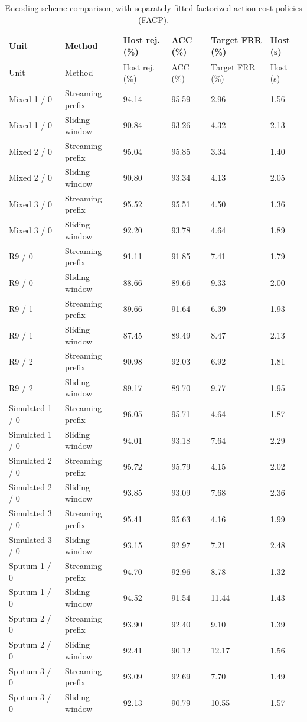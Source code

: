 \begin{longtable}{llllll}
\caption{Encoding scheme comparison, with separately fitted factorized action-cost policies (FACP).}\label{tab:s_encoder}\\
\toprule
Unit & Method & Host rej. (\%) & ACC (\%) & Target FRR (\%) & Host (s)\\\midrule\endfirsthead
\toprule
Unit & Method & Host rej. (\%) & ACC (\%) & Target FRR (\%) & Host (s)\\\midrule\endhead
\bottomrule\endfoot
Mixed 1 / 0 & Streaming prefix & 94.14 & 95.59 & 2.96 & 1.56\\
Mixed 1 / 0 & Sliding window & 90.84 & 93.26 & 4.32 & 2.13\\
Mixed 2 / 0 & Streaming prefix & 95.04 & 95.85 & 3.34 & 1.40\\
Mixed 2 / 0 & Sliding window & 90.80 & 93.34 & 4.13 & 2.05\\
Mixed 3 / 0 & Streaming prefix & 95.52 & 95.51 & 4.50 & 1.36\\
Mixed 3 / 0 & Sliding window & 92.20 & 93.78 & 4.64 & 1.89\\
R9 / 0 & Streaming prefix & 91.11 & 91.85 & 7.41 & 1.79\\
R9 / 0 & Sliding window & 88.66 & 89.66 & 9.33 & 2.00\\
R9 / 1 & Streaming prefix & 89.66 & 91.64 & 6.39 & 1.93\\
R9 / 1 & Sliding window & 87.45 & 89.49 & 8.47 & 2.13\\
R9 / 2 & Streaming prefix & 90.98 & 92.03 & 6.92 & 1.81\\
R9 / 2 & Sliding window & 89.17 & 89.70 & 9.77 & 1.95\\
Simulated 1 / 0 & Streaming prefix & 96.05 & 95.71 & 4.64 & 1.87\\
Simulated 1 / 0 & Sliding window & 94.01 & 93.18 & 7.64 & 2.29\\
Simulated 2 / 0 & Streaming prefix & 95.72 & 95.79 & 4.15 & 2.02\\
Simulated 2 / 0 & Sliding window & 93.85 & 93.09 & 7.68 & 2.36\\
Simulated 3 / 0 & Streaming prefix & 95.41 & 95.63 & 4.16 & 1.99\\
Simulated 3 / 0 & Sliding window & 93.15 & 92.97 & 7.21 & 2.48\\
Sputum 1 / 0 & Streaming prefix & 94.70 & 92.96 & 8.78 & 1.32\\
Sputum 1 / 0 & Sliding window & 94.52 & 91.54 & 11.44 & 1.43\\
Sputum 2 / 0 & Streaming prefix & 93.90 & 92.40 & 9.10 & 1.39\\
Sputum 2 / 0 & Sliding window & 92.41 & 90.12 & 12.17 & 1.56\\
Sputum 3 / 0 & Streaming prefix & 93.09 & 92.69 & 7.70 & 1.49\\
Sputum 3 / 0 & Sliding window & 92.13 & 90.79 & 10.55 & 1.57\\
\end{longtable}
